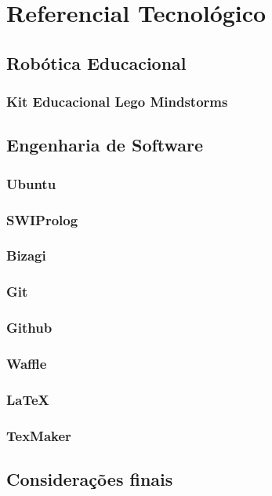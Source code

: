 \chapter{Referencial Tecnológico}

\section{Robótica Educacional}
\subsection{Kit Educacional Lego Mindstorms}

\section{Engenharia de Software}
\subsection{Ubuntu}
\subsection{SWIProlog}
\subsection{Bizagi}
\subsection{Git}
\subsection{Github}
\subsection{Waffle}
\subsection{LaTeX}
\subsection{TexMaker}

\section{Considerações finais}